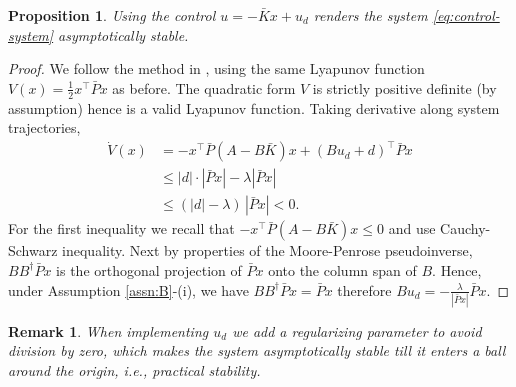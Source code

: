 \documentclass[letterpaper, 10 pt, conference]{ieeeconf}  %
\newtheorem{proposition}{Proposition}
\newtheorem{remark}{Remark}
\newcommand{\tp}{^\top}
\begin{document}
\begin{proposition}
Using the control $u = -\bar{K}x + u_d$ renders the system \eqref{eq:control-system} asymptotically stable. 
\end{proposition}
\begin{proof}
We follow the method in \cite[Chapter 14.2]{khalil}, using the same Lyapunov function $V(x) = \frac{1}{2} x\tp \bar{P}x$ as before. 
The quadratic form $V$ is strictly positive definite (by assumption) hence is a valid Lyapunov function. Taking derivative along system trajectories, 
\begin{align*}
\dot{V}(x) &= -x\tp \bar{P}(A - B\bar{K})x  +  (Bu_d + d)\tp \bar{P} x \\
& \le  | d | \cdot | \bar{P}x| -\lambda |\bar{P} x| \\
& \le  (|d| - \lambda ) \, | \bar{P}x| < 0.
\end{align*}
For the first inequality we recall that $-x\tp \bar{P}(A - B\bar{K})x \le 0$ and use Cauchy-Schwarz inequality. 
Next by properties of the Moore-Penrose pseudoinverse, $BB^{\dagger}\bar{P}x$ is the orthogonal projection of $\bar{P}x$ onto the column span of $B$. 
Hence, under Assumption \ref{assn:B}-(i), we have $BB^{\dagger}\bar{P}x = \bar{P}x$ therefore $Bu_d = - \frac{\lambda}{| \bar{P}x|} \bar{P}x$.
\end{proof}
 \begin{remark}
     When implementing $u_d$ we add a regularizing parameter to avoid division by zero, which makes the system asymptotically stable till it enters a ball around the origin, i.e., practical stability. 
 \end{remark}
\end{document}
